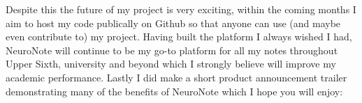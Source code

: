 Despite this the future of my project is very exciting, within the coming months I aim to host my code publically on Github so that anyone can use (and maybe even contribute to) my project. Having built the platform I always wished I had, NeuroNote will continue to be my go-to platform for all my notes throughout Upper Sixth, university and beyond which I strongly believe will improve my academic performance. Lastly I did make a short product announcement trailer demonstrating many of the benefits of NeuroNote which I hope you will enjoy:
